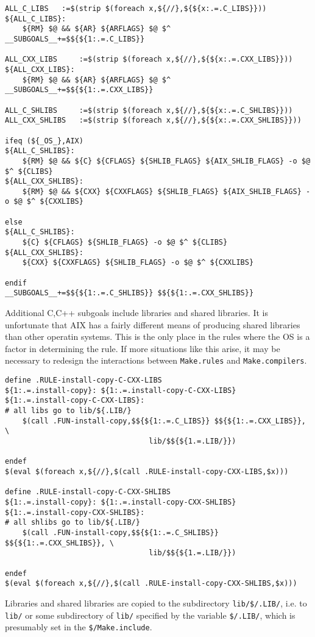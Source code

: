 \documentclass{article}
\begin{document}
\begin{verbatim}
ALL_C_LIBS   :=$(strip $(foreach x,${//},${${x:.=.C_LIBS}}))
${ALL_C_LIBS}:
	${RM} $@ && ${AR} ${ARFLAGS} $@ $^
__SUBGOALS__+=$${${1:.=.C_LIBS}}

ALL_CXX_LIBS     :=$(strip $(foreach x,${//},${${x:.=.CXX_LIBS}}))
${ALL_CXX_LIBS}:
	${RM} $@ && ${AR} ${ARFLAGS} $@ $^
__SUBGOALS__+=$${${1:.=.CXX_LIBS}}

ALL_C_SHLIBS     :=$(strip $(foreach x,${//},${${x:.=.C_SHLIBS}}))
ALL_CXX_SHLIBS   :=$(strip $(foreach x,${//},${${x:.=.CXX_SHLIBS}}))

ifeq (${_OS_},AIX)
${ALL_C_SHLIBS}:
	${RM} $@ && ${C} ${CFLAGS} ${SHLIB_FLAGS} ${AIX_SHLIB_FLAGS} -o $@ $^ ${CLIBS}
${ALL_CXX_SHLIBS}:
	${RM} $@ && ${CXX} ${CXXFLAGS} ${SHLIB_FLAGS} ${AIX_SHLIB_FLAGS} -o $@ $^ ${CXXLIBS}

else
${ALL_C_SHLIBS}:
	${C} ${CFLAGS} ${SHLIB_FLAGS} -o $@ $^ ${CLIBS}
${ALL_CXX_SHLIBS}:
	${CXX} ${CXXFLAGS} ${SHLIB_FLAGS} -o $@ $^ ${CXXLIBS}

endif
__SUBGOALS__+=$${${1:.=.C_SHLIBS}} $${${1:.=.CXX_SHLIBS}}
\end{verbatim}
Additional C,C++ subgoals include libraries and shared libraries.  It is
unfortunate that AIX has a fairly different means of producing shared
libraries than other operatin systems.  This is the only place in the
rules where the OS is a factor in determining the rule.  If more situations
like this arise, it may be necessary to redesign the interactions
between \verb+Make.rules+ and \verb+Make.compilers+.

\begin{verbatim}
define .RULE-install-copy-C-CXX-LIBS
${1:.=.install-copy}: ${1:.=.install-copy-C-CXX-LIBS}
${1:.=.install-copy-C-CXX-LIBS}:
# all libs go to lib/${.LIB/}
	$(call .FUN-install-copy,$${${1:.=.C_LIBS}} $${${1:.=.CXX_LIBS}}, \
                                 lib/$${${1.=.LIB/}})

endef
$(eval $(foreach x,${//},$(call .RULE-install-copy-CXX-LIBS,$x)))

define .RULE-install-copy-C-CXX-SHLIBS
${1:.=.install-copy}: ${1:.=.install-copy-CXX-SHLIBS}
${1:.=.install-copy-CXX-SHLIBS}:
# all shlibs go to lib/${.LIB/}
	$(call .FUN-install-copy,$${${1:.=.C_SHLIBS}} $${${1:.=.CXX_SHLIBS}}, \
                                 lib/$${${1.=.LIB/}})

endef
$(eval $(foreach x,${//},$(call .RULE-install-copy-CXX-SHLIBS,$x)))
\end{verbatim}
Libraries and shared libraries are copied to the subdirectory
\verb+lib/$/.LIB/+, i.e. to \verb+lib/+ or some subdirectory of
\verb+lib/+ specified by the  variable \verb+$/.LIB/+, which is
presumably set in the \verb+$/Make.include+.
\end{document}
